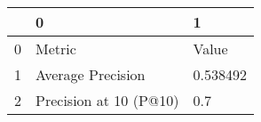 \begin{tabular}{lll}
\toprule
{} &                       0 &         1 \\
\midrule
0 &                  Metric &     Value \\
1 &       Average Precision &  0.538492 \\
2 &  Precision at 10 (P@10) &       0.7 \\
\bottomrule
\end{tabular}
